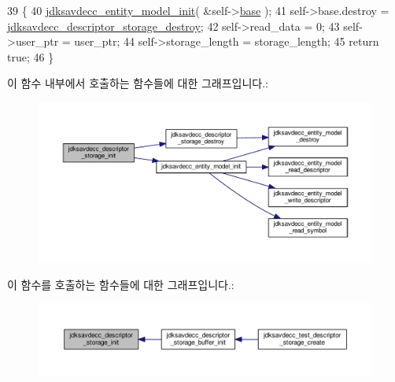 \begin{DoxyCode}
39 \{
40     \hyperlink{group__entity_gabd1049d066913d2480ae304c8014deed}{jdksavdecc\_entity\_model\_init}( &self->\hyperlink{structjdksavdecc__descriptor__storage_ab9b4b2eaa5e1a290a371291da6a9a4d6}{base} );
41     \textcolor{keyword}{self}->base.destroy = \hyperlink{group__jdksavdecc__descriptor__storage_gafd2b10b04fedb78ed65940116a9d35bb}{jdksavdecc\_descriptor\_storage\_destroy};
42     \textcolor{keyword}{self}->read\_data = 0;
43     \textcolor{keyword}{self}->user\_ptr = user\_ptr;
44     \textcolor{keyword}{self}->storage\_length = storage\_length;
45     \textcolor{keywordflow}{return} \textcolor{keyword}{true};
46 \}
\end{DoxyCode}


이 함수 내부에서 호출하는 함수들에 대한 그래프입니다.\+:
\nopagebreak
\begin{figure}[H]
\begin{center}
\leavevmode
\includegraphics[width=350pt]{group__jdksavdecc__descriptor__storage_ga8057702fdd5c972ac954b7e5d0705d08_cgraph}
\end{center}
\end{figure}




이 함수를 호출하는 함수들에 대한 그래프입니다.\+:
\nopagebreak
\begin{figure}[H]
\begin{center}
\leavevmode
\includegraphics[width=350pt]{group__jdksavdecc__descriptor__storage_ga8057702fdd5c972ac954b7e5d0705d08_icgraph}
\end{center}
\end{figure}


